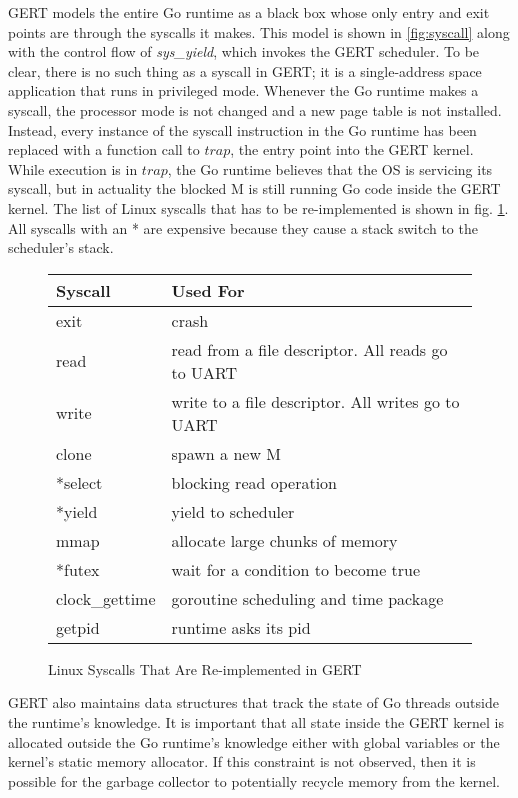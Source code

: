 GERT models the entire Go runtime as a black box whose only entry and exit points
are through the syscalls it makes. This model is shown in \ref{fig:syscall} along with the
control flow of \textit{sys\_yield}, which invokes the GERT scheduler. To be clear, there is no such thing as a syscall in GERT;
it is a single-address space application that runs in privileged mode.
Whenever the Go runtime makes a syscall, the processor mode is not changed and a new page table
is not installed. Instead, every instance of the syscall instruction in the Go runtime has been
replaced with a function call to $trap$, the entry point into the GERT kernel.
While execution is in $trap$, the Go runtime believes
that the OS is servicing its syscall, but in actuality the blocked M is still running Go code inside
the GERT kernel. The list of Linux syscalls that has to be re-implemented is shown in fig. \ref{fig:syscalls}.
All syscalls with an * are expensive because they cause a stack switch to the scheduler's stack.


\begin{figure} [h]
\begin{center}
  \begin{tabular}{ | l | l |}
    \hline
    Syscall & Used For \\ \hline
    exit & crash \\ \hline
    read & read from a file descriptor. All reads go to UART\\ \hline
    write & write to a file descriptor. All writes go to UART\\ \hline
    clone & spawn a new M\\ \hline
    *select & blocking read operation\\ \hline
    *yield & yield to scheduler\\ \hline
    mmap & allocate large chunks of memory\\ \hline
    *futex & wait for a condition to become true\\ \hline
    clock\_gettime & goroutine scheduling and time package\\ \hline
    getpid & runtime asks its pid\\ \hline
  \end{tabular}
\end{center}
  \caption{Linux Syscalls That Are Re-implemented in GERT}  \label{fig:syscalls}
\end{figure}

GERT also maintains data structures that track the state of Go threads
outside the runtime's knowledge. It is important that all state inside the GERT kernel is
allocated outside the Go runtime's knowledge either with global variables or the kernel's
static memory allocator. If this constraint is not observed, then it is possible for the garbage collector
to potentially recycle memory from the kernel.

